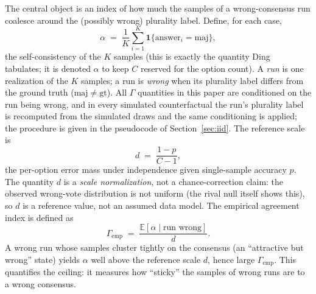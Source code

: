 \documentclass[a4paper,fleqn]{cas-sc}
\newcommand{\agreementIndex}{\Gamma}
\begin{document}
The central object is an index of how much the samples of a
wrong-consensus run coalesce around the (possibly wrong) plurality label.
Define, for
each case,
\[
\alpha \;=\; \frac{1}{K}\sum_{i=1}^{K}
\mathbf{1}\{\text{answer}_i = \mathrm{maj}\},
\]
the self-consistency of the $K$ samples (this is exactly the quantity
Ding~\cite{ding2026auditing} tabulates; it is denoted $\alpha$ to keep
$C$ reserved for the option count). A \emph{run} is one realization of
the $K$ samples; a run is \emph{wrong} when its plurality label differs
from the ground truth ($\mathrm{maj}\ne\mathrm{gt}$). All $\agreementIndex$
quantities in this paper are conditioned on the run being wrong, and in
every simulated counterfactual the run's plurality label is recomputed
from the simulated draws and the same conditioning is applied; the
procedure is given in the pseudocode of
Section~\ref{sec:iid}. The reference scale is
\[
d \;=\; \frac{1-p}{C-1},
\]
the per-option error mass under independence given single-sample
accuracy $p$. The quantity $d$ is a \emph{scale normalization}, not a
chance-correction claim: the observed wrong-vote distribution is not
uniform (the rival null itself shows this), so $d$ is a reference value,
not an assumed data model. The empirical agreement index is defined as
\[
\agreementIndex_{\mathrm{emp}} \;=\; \frac{\mathbb{E}[\alpha \mid \text{run wrong}]}{d}.
\]
A wrong run whose samples cluster tightly on the
consensus (an ``attractive but wrong'' state) yields $\alpha$ well above
the reference scale $d$, hence large $\agreementIndex_{\mathrm{emp}}$. This
quantifies the ceiling: it measures how ``sticky'' the samples of wrong
runs are to a wrong consensus.
\end{document}

